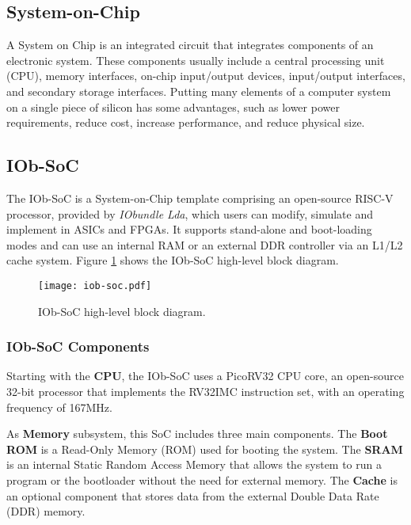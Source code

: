 
\subsection{System-on-Chip}
A System on Chip is an integrated circuit that integrates components of an electronic system. These components usually include a central processing unit (CPU), memory interfaces, on-chip input/output devices, input/output interfaces, and secondary storage interfaces.
Putting many elements of a computer system on a single piece of silicon has some advantages, such as lower power requirements, reduce cost, increase performance, and reduce physical size.

\subsection{IOb-SoC}
The IOb-SoC is a System-on-Chip template comprising an open-source RISC-V processor, provided by \textit{IObundle Lda}, which users can modify, simulate and implement in ASICs and FPGAs.
It supports stand-alone and boot-loading modes and can use an internal RAM or an external DDR controller via an L1/L2 cache system. 
Figure \ref{fig:iob} shows the IOb-SoC high-level block diagram.

\begin{figure}[H]
\centerline{\texttt{[image: iob-soc.pdf]}}
\caption{IOb-SoC high-level block diagram.}
\label{fig:iob}
\end{figure}

\subsubsection{IOb-SoC Components}
Starting with the \textbf{CPU}, the IOb-SoC uses a PicoRV32 CPU core, an open-source 32-bit processor that implements the RV32IMC instruction set, with an operating frequency of 167MHz.

As \textbf{Memory} subsystem, this SoC includes three main components. The \textbf{Boot ROM} is a Read-Only Memory (ROM) used for booting the system. The \textbf{SRAM} is an internal Static Random Access Memory that allows the system to run a program or the bootloader without the need for external memory. The \textbf{Cache} is an optional component that stores data from the external Double Data Rate (DDR) memory.

